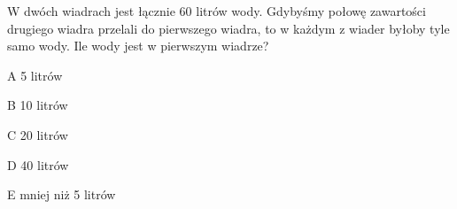 \begin{tresc}
W dwóch wiadrach jest łącznie 60 litrów wody. Gdybyśmy połowę zawartości drugiego wiadra przelali do pierwszego wiadra, to w każdym z wiader byłoby tyle samo wody. Ile wody jest w pierwszym wiadrze?
\end{tresc}
\begin{wariant}{A} 5 litrów \end{wariant}
\begin{wariant}{B} 10 litrów \end{wariant}
\begin{wariant}{C} 20 litrów \end{wariant}
\begin{wariant}{D} 40 litrów \end{wariant}
\begin{wariant}{E} mniej niż 5 litrów \end{wariant}
